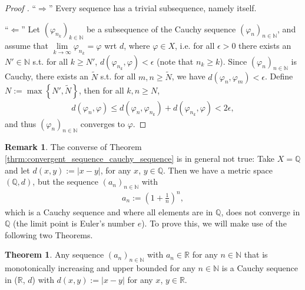 \documentclass[12pt, a4paper]{article}
\numberwithin{equation}{section}
\theoremstyle{definition}
\theoremstyle{definition}
\newtheorem{remark}[thm]{Remark} %
\newtheorem{theorem}[thm]{Theorem}
\newcommand{\abs}[1]{\left\vert #1 \right\vert}
\newcommand{\seq}[1][\varphi]{\left( #1 \right)_{n \in \mathbb{N}}}
\begin{document}
	\begin{proof}[Proof \cite{354965}]
		\enquote{$\Longrightarrow$} Every sequence has a trivial subsequence, namely itself.
		
		\enquote{$\Longleftarrow$} Let $\left(\varphi_{n_k}\right)_{k\in\mathbb N}$ be a subsequence of the Cauchy sequence $\seq[\varphi_n]$, and assume that $\lim\limits_{k\to\infty}\varphi_{n_k} = \varphi$ wrt $d$, where $\varphi\in X$, i.e. for all $\epsilon > 0$ there exists an $N'\in\mathbb N$ s.t. for all $k\geq N'$, $d(\varphi_{n_k}, \varphi) < \epsilon$ (note that $n_k \geq k$). Since $\seq[\varphi_n]$ is Cauchy, there exists an $\tilde{N}$ s.t. for all $m, n\geq \tilde{N}$, we have $d(\varphi_n, \varphi_m) < \epsilon$. Define $N := \max\left\{N', \tilde{N}\right\}$, then for all $k, n\geq N$,
		\begin{align*}
			d(\varphi_n, \varphi) \leq d(\varphi_n, \varphi_{n_k}) + d(\varphi_{n_k}, \varphi) < 2\epsilon,
		\end{align*}
		and thus $\seq[\varphi_n]$ converges to $\varphi$.
	\end{proof}

	\begin{remark}\label{remark:cauchy_not_convergent_necess}
		The converse of Theorem \ref{thrm:convergent_sequence_cauchy_sequence} is in general not true: Take $X=\mathbb Q$ and let $d(x, y) := \abs{x - y}$, for any $x$, $y\in\mathbb Q$. Then we have a metric space $(\mathbb Q, d)$, but the sequence $(a_n)_{n\in\mathbb N}$ with
		\begin{align}\label{eq:seq_euler}
			a_n := \left(1 + \frac{1}{n}\right)^n,
		\end{align}
		which is a Cauchy sequence and where all elements are in $\mathbb Q$, does not converge in $\mathbb Q$ (the limit point is Euler's number $e$). To prove this, we will make use of the following two Theorems.
	\end{remark}
	
	\begin{theorem}\label{thrm:mono_inc_seq_Cauchy}
		Any sequence $(a_n)_{n\in\mathbb N}$ with $a_n\in \mathbb R$ for any $n\in \mathbb N$ that is monotonically increasing and upper bounded for any $n\in\mathbb N$ is a Cauchy sequence in ($\mathbb R$, $d$) with $d(x, y):= \abs{x - y}$ for any $x$, $y\in \mathbb R$.		
	\end{theorem}
\end{document}
